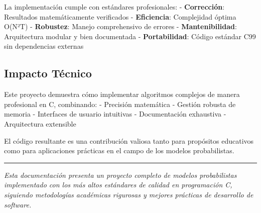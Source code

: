 \documentclass[
]{article}
\begin{document}
La implementación cumple con estándares profesionales: -
\textbf{Corrección}: Resultados matemáticamente verificados -
\textbf{Eficiencia}: Complejidad óptima O(N²T) - \textbf{Robustez}:
Manejo comprehensivo de errores - \textbf{Mantenibilidad}: Arquitectura
modular y bien documentada - \textbf{Portabilidad}: Código estándar C99
sin dependencias externas

\subsection{Impacto Técnico}\label{impacto-tuxe9cnico}

Este proyecto demuestra cómo implementar algoritmos complejos de manera
profesional en C, combinando: - Precisión matemática - Gestión robusta
de memoria - Interfaces de usuario intuitivas - Documentación exhaustiva
- Arquitectura extensible

El código resultante es una contribución valiosa tanto para propósitos
educativos como para aplicaciones prácticas en el campo de los modelos
probabilistas.

\begin{center}\rule{0.5\linewidth}{0.5pt}\end{center}

\emph{Esta documentación presenta un proyecto completo de modelos
probabilistas implementado con los más altos estándares de calidad en
programación C, siguiendo metodologías académicas rigurosas y mejores
prácticas de desarrollo de software.}
\end{document}
